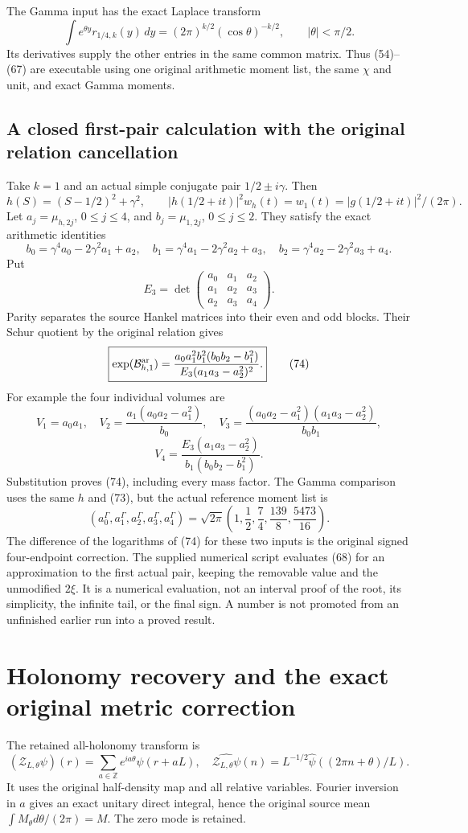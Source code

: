 The Gamma input has the exact Laplace transform
\[
 \int e^{\theta y}r_{1/4,k}(y)\,dy
    =(2\pi)^{k/2}(\cos\theta)^{-k/2},\qquad |\theta|<\pi/2.
 \tag{71}
\]
Its derivatives supply the other entries in the same common matrix. Thus (54)--(67) are executable using one original arithmetic moment list, the same $\chi$ and unit, and exact Gamma moments.

\subsection{A closed first-pair calculation with the original relation cancellation}
Take $k=1$ and an actual simple conjugate pair $1/2\pm i\gamma$. Then
\[
 h(S)=(S-1/2)^2+\gamma^2,\qquad
 |h(1/2+it)|^2w_h(t)=w_1(t)=|g(1/2+it)|^2/(2\pi).
 \tag{72}
\]
Let $a_j=\mu_{h,2j}$, $0\le j\le4$, and $b_j=\mu_{1,2j}$, $0\le j\le2$. They satisfy the exact arithmetic identities
\[
 b_0=\gamma^4a_0-2\gamma^2a_1+a_2,
 \quad b_1=\gamma^4a_1-2\gamma^2a_2+a_3,
 \quad b_2=\gamma^4a_2-2\gamma^2a_3+a_4.
 \tag{73}
\]
Put
\[
 E_3=\det\begin{pmatrix}a_0&a_1&a_2\\a_1&a_2&a_3\\a_2&a_3&a_4\end{pmatrix}.
\]
Parity separates the source Hankel matrices into their even and odd blocks. Their Schur quotient by the original relation gives
\[
 \boxed{\exp(\mathcal B^{\rm ar}_{h,1})
 =\frac{a_0a_1^2b_1^2(b_0b_2-b_1^2)}
              {E_3(a_1a_3-a_2^2)^2}.}
 \tag{74}
\]
For example the four individual volumes are
\[
 V_1=a_0a_1,\quad
 V_2=\frac{a_1(a_0a_2-a_1^2)}{b_0},\quad
 V_3=\frac{(a_0a_2-a_1^2)(a_1a_3-a_2^2)}{b_0b_1},
\]
\[
 V_4=\frac{E_3(a_1a_3-a_2^2)}{b_1(b_0b_2-b_1^2)}.
 \tag{75}
\]
Substitution proves (74), including every mass factor. The Gamma comparison uses the same $h$ and (73), but the actual reference moment list is
\[
 (a_0^\Gamma,a_1^\Gamma,a_2^\Gamma,a_3^\Gamma,a_4^\Gamma)
 =\sqrt{2\pi}\left(1,\frac12,\frac74,\frac{139}{8},\frac{5473}{16}\right).
 \tag{76}
\]
The difference of the logarithms of (74) for these two inputs is the original signed four-endpoint correction. The supplied numerical script evaluates (68) for an approximation to the first actual pair, keeping the removable value and the unmodified $2\xi$. It is a numerical evaluation, not an interval proof of the root, its simplicity, the infinite tail, or the final sign. A number is not promoted from an unfinished earlier run into a proved result.

\section{Holonomy recovery and the exact original metric correction}
The retained all-holonomy transform is
\[
 (\mathcal Z_{L,\theta}\psi)(r)
   =\sum_{a\in\mathbb Z}e^{ia\theta}\psi(r+aL),
 \quad\widehat{\mathcal Z_{L,\theta}\psi}(n)
   =L^{-1/2}\widehat\psi((2\pi n+\theta)/L).
 \tag{77}
\]
It uses the original half-density map and all relative variables. Fourier inversion in $a$ gives an exact unitary direct integral, hence the original source mean $\int M_\theta d\theta/(2\pi)=M$. The zero mode is retained.

